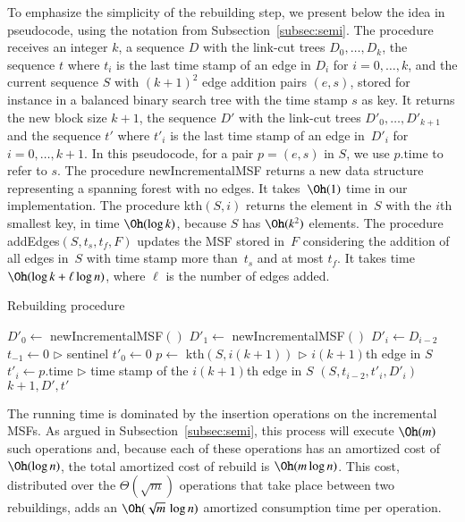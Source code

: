 \documentclass[3p,times,procedia]{elsarticle}
\begin{document}
To emphasize the simplicity of the rebuilding step, we present below 
the idea in pseudocode, using the notation from Subsection~\ref{subsec:semi}.
The procedure receives an integer $k$, a sequence $D$ with the link-cut trees $D_0,\ldots,D_k$, 
the sequence $t$ where $t_i$ is the last time stamp of an edge in $D_i$ for $i=0,\ldots,k$, and
the current sequence $S$ with $(k+1)^2$ edge addition pairs $(e,s)$, stored 
for instance in a balanced binary search tree with the time stamp $s$ as key.
It returns the new block size $k+1$, the sequence $D'$ with 
the link-cut trees $D'_0,\ldots,D'_{k+1}$ and the sequence $t'$ 
where $t'_i$ is the last time stamp of an edge in~$D'_i$ for $i=0,\ldots,k+1$. 
In this pseudocode, for a pair $p=(e,s)$ in $S$, we use 
$p.\textrm{time}$ to refer to $s$. %
The procedure {\sc newIncrementalMSF} returns 
a new data structure representing a spanning forest with no edges. 
It takes~$\Oh(1)$ time in our implementation. 
The procedure {\sc kth}$(S,i)$ returns the element in~$S$ with the $i$th smallest key, 
in time $\Oh(\log k)$, because $S$ has $\Oh(k^2)$ elements. 
The procedure {\sc addEdges}$(S,t_s,t_f,F)$ updates the MSF stored in~$F$ 
considering the addition of all edges in~$S$ with time stamp more than~$t_s$ 
and at most $t_f$.
It takes time $\Oh(\log k + \ell\log n)$, where $\ell$ is the number of edges added.

\medskip

\begin{algorithm}[h!]
    \caption{Rebuilding procedure}\label{rmsf-build-decomp}
    \begin{algorithmic}[1]
        \State $D'_0 \gets$ {\sc newIncrementalMSF}$()$
        \State $D'_1 \gets$ {\sc newIncrementalMSF}$()$
        \State $D'_i \gets D_{i-2}$
        \EndFor
        \State $t_{-1} \gets 0$ \hfill {\footnotesize $\rhd$ sentinel}
        \State $t'_0 \gets 0$ 
        \State $p \gets$ {\sc kth}$(S,i(k+1))$ \hfill {\footnotesize $\rhd$ $i(k+1)$th edge in $S$}
        \State $t'_i \gets p.\textrm{time}$ \hfill {\footnotesize $\rhd$ time stamp of the $i(k+1)$th edge in $S$}
        $(S,t_{i-2},t'_i,D'_i)$
        \EndFor
        \State \Return $k+1,D',t'$
        \EndFunction
    \end{algorithmic}
\end{algorithm}

The running time is dominated by the insertion operations 
on the incremental MSFs.  As argued in Subsection~\ref{subsec:semi}, 
this process will execute $\Oh(m)$ such operations and, 
because each of these operations has an amortized cost of $\Oh(\log{n})$,
the total amortized cost of {\sc rebuild} is $\Oh(m \log{n})$.  This cost, distributed 
over the $\Theta(\sqrt{m})$ operations that take place between two rebuildings,
adds an $\Oh(\sqrt{m}\,\log{n})$ amortized consumption time per operation.
\end{document}
